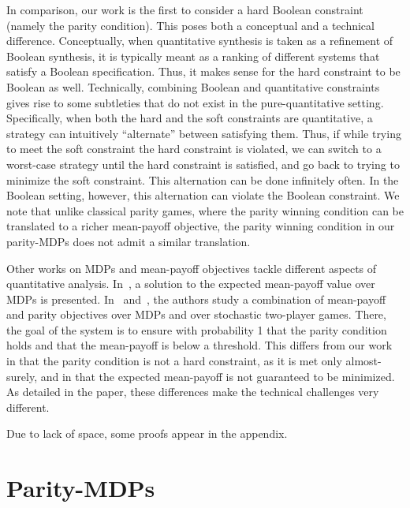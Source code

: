 \documentclass[runningheads,a4paper]{llncs}
\newcommand{\stam}[1]{}
\begin{document}
In comparison, our work is the first to consider a hard Boolean constraint (namely the parity condition). This poses both a conceptual and a technical difference. Conceptually, when quantitative synthesis is taken as a refinement of Boolean synthesis, it is typically meant as a ranking of different systems that satisfy a Boolean specification. Thus, it makes sense for the hard constraint to be Boolean as well. 
Technically, combining Boolean and quantitative constraints gives rise to some subtleties that do not exist in the pure-quantitative setting. Specifically, when both the hard and the soft constraints are quantitative, a strategy can intuitively ``alternate'' between satisfying them. Thus, if while trying to meet the soft constraint the hard constraint is violated, we can switch to a worst-case strategy until the hard constraint is satisfied, and go back to trying to minimize the soft constraint. This alternation can be done infinitely often. In the Boolean setting, however, this alternation can violate the Boolean constraint. We note that 
unlike classical parity games, where the parity winning condition can be translated to a richer mean-payoff objective,
the parity winning condition in our parity-MDPs does not admit a similar translation.


Other works on MDPs and mean-payoff objectives tackle different aspects of quantitative analysis. In~\cite{Put14}, a solution to the expected mean-payoff value over MDPs is presented. In~\cite{CD11} and~\cite{CLGO14}, the authors study a combination of mean-payoff and parity objectives over MDPs and over stochastic two-player games. There, the goal of the system is to ensure with probability 1 that the parity condition holds and that the mean-payoff is below a threshold. This differs from our work in that the parity condition is not a hard constraint, as it is met only almost-surely, and in that the 
expected mean-payoff is not guaranteed to be
minimized. As detailed in the paper, these differences make the technical challenges very different.

Due to lack of space, some proofs appear in the appendix.
\section{Parity-MDPs}
\label{sec:prelim}

\stam{
A Markov chain  consists of a finite state space  and a 
  stochastic transition matrix . That is, for all , we have . Given an initial state , consider the vector  in which  and  for every . The {\em limiting distribution} of  is . The limiting distribution satisfies , and can be computed in polynomial time~\cite{GL97}.
}
\end{document}
